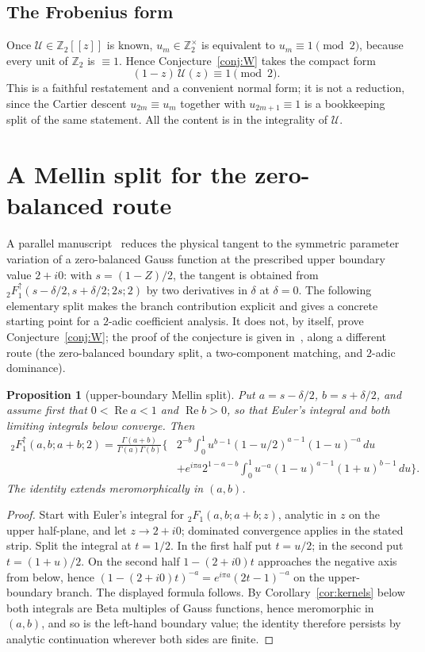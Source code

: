 \documentclass[10pt,a4paper]{amsart}
\newtheorem{proposition}[theorem]{Proposition}
\newcommand{\Zt}{\mathbb Z_2}
\begin{document}
\subsection{The Frobenius form}

Once $\mathcal U\in\Zt[[z]]$ is known, $u_m\in\Zt^\times$ is equivalent to $u_m\equiv1\pmod 2$, because every unit of $\Zt$ is $\equiv1$.  Hence Conjecture~\ref{conj:W} takes the compact form
\[
  (1-z)\,\mathcal U(z)\equiv1\pmod 2 .
\]
This is a faithful restatement and a convenient normal form; it is not a reduction, since the Cartier descent $u_{2m}\equiv u_m$ together with
$u_{2m+1}\equiv1$ is a bookkeeping split of the same statement.  All the content is in the integrality of $\mathcal U$.


\section{A Mellin split for the zero-balanced route}\label{sec:mellinsplit}
A parallel manuscript~\cite{Ultraspherical} reduces the physical tangent to the symmetric parameter variation of a zero-balanced Gauss function at the prescribed upper boundary value $2+i0$: with $s=(1-Z)/2$, the tangent is obtained from ${}_2F_1^{\uparrow}(s-\delta/2,s+\delta/2;2s;2)$ by two derivatives in $\delta$ at $\delta=0$.  The following elementary split makes the branch contribution explicit and gives a concrete starting point for a $2$-adic coefficient analysis.  It does not, by itself, prove Conjecture~\ref{conj:W}; the proof of the conjecture is given in~\cite{Ultraspherical}, along a different route (the zero-balanced boundary split, a two-component matching, and $2$-adic dominance).

\begin{proposition}[upper-boundary Mellin split]\label{prop:mellinsplit}
Put $a=s-\delta/2$, $b=s+\delta/2$, and assume first that $0<\operatorname{Re}a<1$ and $\operatorname{Re}b>0$, so that Euler's integral and both limiting integrals below converge.  Then
\begin{align*}
 {}_2F_1^{\uparrow}(a,b;a+b;2)
 =\frac{\Gamma(a+b)}{\Gamma(a)\Gamma(b)}\bigg\{&
 2^{-b}\int_0^1 u^{b-1}(1-u/2)^{a-1}(1-u)^{-a}\,du\\
 &+e^{i\pi a}2^{1-a-b}\int_0^1
 u^{-a}(1-u)^{a-1}(1+u)^{b-1}\,du\bigg\}.
\end{align*}
The identity extends meromorphically in $(a,b)$.
\end{proposition}
\begin{proof}
Start with Euler's integral for ${}_2F_1(a,b;a+b;z)$, analytic in $z$ on the upper half-plane, and let $z\to2+i0$; dominated convergence applies in the stated strip.  Split the integral at $t=1/2$.  In the first half put $t=u/2$; in the second put $t=(1+u)/2$.  On the second half $1-(2+i0)t$ approaches the negative axis from below, hence $(1-(2+i0)t)^{-a}=e^{i\pi a}(2t-1)^{-a}$ on the upper-boundary branch. The displayed formula follows.  By Corollary~\ref{cor:kernels} below both integrals are Beta multiples of Gauss functions, hence meromorphic in $(a,b)$, and so is the left-hand boundary value; the identity therefore persists by analytic continuation wherever both sides are finite.
\end{proof}
\end{document}
